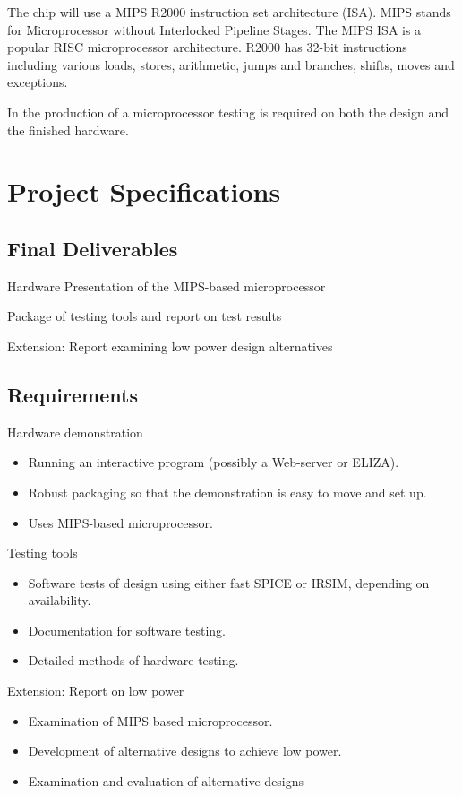 \documentclass[a4paper,12pt]{article}
\begin{document}
The chip will use a MIPS R2000 instruction set architecture
(ISA). MIPS stands for Microprocessor without Interlocked Pipeline
Stages. The MIPS ISA is a popular RISC microprocessor
architecture. R2000 has 32-bit instructions including various loads,
stores, arithmetic, jumps and branches, shifts, moves and exceptions.

In the production of a microprocessor testing is required on both the
design and the finished hardware.

\section{Project Specifications}

\subsection{Final Deliverables}
\begin{enumerate}[{[D}1{]}]
\item Hardware Presentation of the MIPS-based microprocessor
\item Package of testing tools and report on test results
\item Extension: Report examining low power design alternatives
\end{enumerate}

\subsection{Requirements}
\begin{enumerate}[{[R}1{]}]
\item Hardware demonstration
  \begin{itemize}
  \item Running an interactive program (possibly a Web-server or
    ELIZA).
  \item Robust packaging so that the demonstration is easy to
    move and set up.  
  \item Uses MIPS-based microprocessor.
  \end{itemize}

\item Testing tools
  \begin{itemize}
    \item Software tests of design using either fast SPICE or IRSIM,
      depending on availability.
    \item Documentation for software testing.
    \item Detailed methods of hardware testing.
  \end{itemize}
\item Extension: Report on low power
  \begin{itemize}
  \item Examination of MIPS based microprocessor.
  \item Development of alternative designs to achieve low power.
  \item Examination and evaluation of alternative designs
  \end{itemize}
\end{enumerate}
\end{document}
